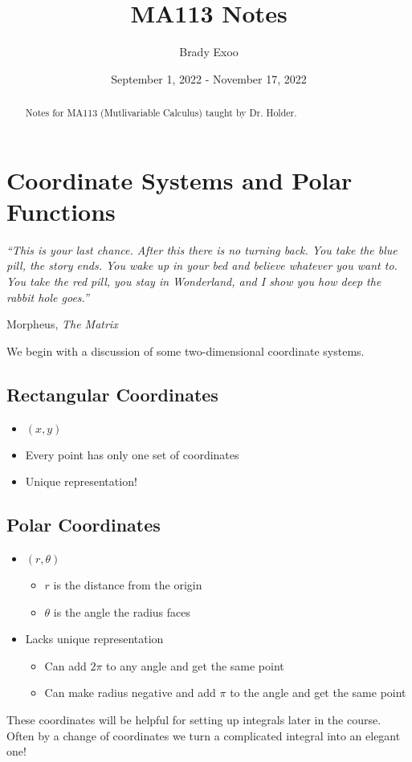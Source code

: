 \documentclass[12pt]{article}
\theoremstyle{plain} %
\theoremstyle{definition}
\theoremstyle{definition}
\theoremstyle{definition}
\theoremstyle{remark}
\begin{document}
\title{MA113 Notes}
\author{Brady Exoo}
\date{September 1, 2022 - November 17, 2022}
\maketitle

\begin{abstract}
Notes for MA113 (Mutlivariable Calculus) taught by Dr. Holder.
\end{abstract}

\tableofcontents

\eject

\section{Coordinate Systems and Polar Functions}
\epigraph{\itshape ``This is your last chance. After this there is no turning back. You take the blue pill, the story ends. You wake up in your bed and believe whatever you want to. You take the red pill, you stay in Wonderland, and I show you how deep the rabbit hole goes.''}{Morpheus, \textit{The Matrix}}
We begin with a discussion of some two-dimensional coordinate systems.

\subsection{Rectangular Coordinates}
\begin{itemize}
    \item $(x,y)$
    \item Every point has only one set of coordinates
    \item Unique representation!
\end{itemize}

\subsection{Polar Coordinates}
\begin{itemize}
    \item $(r,\theta)$
    \begin{itemize}
        \item $r$ is the distance from the origin
        \item $\theta$ is the angle the radius faces
    \end{itemize}
    \item Lacks unique representation
    \begin{itemize}
        \item Can add $2\pi$ to any angle and get the same point
        \item Can make radius negative and add $\pi$ to the angle and get the same point
    \end{itemize}
\end{itemize}
These coordinates will be helpful for setting up integrals later in the course. Often by a change of coordinates we turn a complicated integral into an elegant one!
\end{document}
